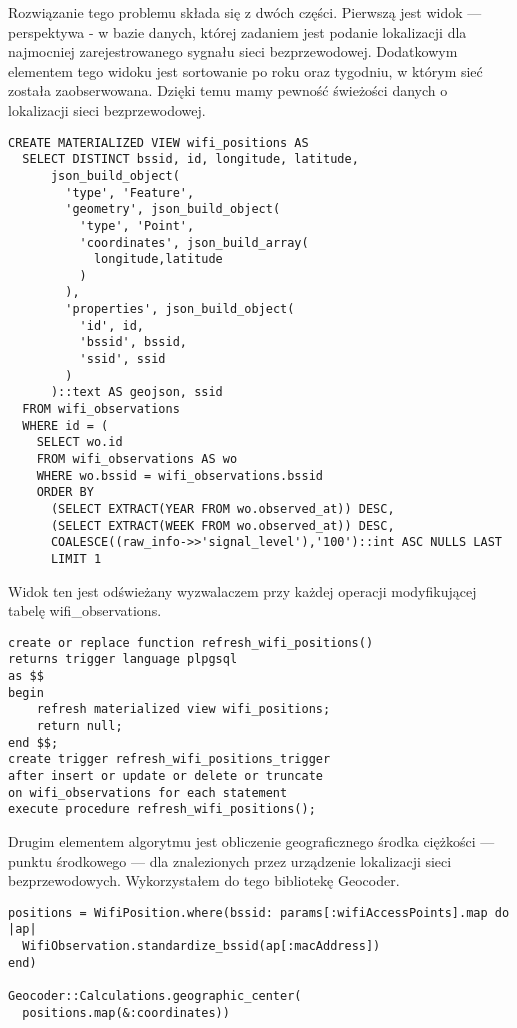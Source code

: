 Rozwiązanie tego problemu składa się z dwóch części. Pierwszą jest widok — perspektywa - w bazie danych, której zadaniem jest podanie lokalizacji dla najmocniej zarejestrowanego sygnału sieci bezprzewodowej. Dodatkowym elementem tego widoku jest sortowanie po roku oraz tygodniu, w którym sieć została zaobserwowana. Dzięki temu mamy pewność świeżości danych o lokalizacji sieci bezprzewodowej.

\begin{verbatim}
CREATE MATERIALIZED VIEW wifi_positions AS
  SELECT DISTINCT bssid, id, longitude, latitude,
      json_build_object(
        'type', 'Feature',
        'geometry', json_build_object(
          'type', 'Point',
          'coordinates', json_build_array(
            longitude,latitude
          )
        ),
        'properties', json_build_object(
          'id', id,
          'bssid', bssid,
          'ssid', ssid
        )
      )::text AS geojson, ssid
  FROM wifi_observations
  WHERE id = (
    SELECT wo.id
    FROM wifi_observations AS wo
    WHERE wo.bssid = wifi_observations.bssid
    ORDER BY
      (SELECT EXTRACT(YEAR FROM wo.observed_at)) DESC,
      (SELECT EXTRACT(WEEK FROM wo.observed_at)) DESC,
      COALESCE((raw_info->>'signal_level'),'100')::int ASC NULLS LAST
      LIMIT 1
\end{verbatim}

Widok ten jest odświeżany wyzwalaczem przy każdej operacji modyfikującej tabelę wifi\_observations.

\begin{verbatim}
create or replace function refresh_wifi_positions()
returns trigger language plpgsql
as $$
begin
    refresh materialized view wifi_positions;
    return null;
end $$;
create trigger refresh_wifi_positions_trigger
after insert or update or delete or truncate
on wifi_observations for each statement
execute procedure refresh_wifi_positions();
\end{verbatim}

Drugim elementem algorytmu jest obliczenie geograficznego środka ciężkości — punktu środkowego — dla znalezionych przez urządzenie lokalizacji sieci bezprzewodowych. Wykorzystałem do tego bibliotekę Geocoder.

\begin{verbatim}
positions = WifiPosition.where(bssid: params[:wifiAccessPoints].map do |ap|
  WifiObservation.standardize_bssid(ap[:macAddress])
end)

Geocoder::Calculations.geographic_center(
  positions.map(&:coordinates))
\end{verbatim}


